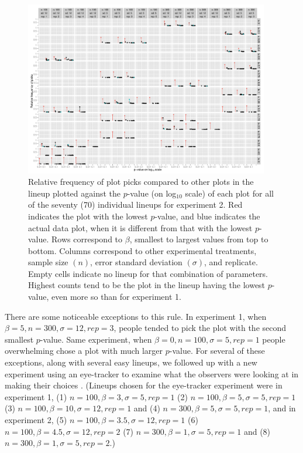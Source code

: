 \documentclass[12pt]{article}
\newcommand{\blue}[1]{{\color{blue} #1}} %
\begin{document}
\begin{figure}[hbtp]
   \centering
       \includegraphics[width=0.95\textwidth]{p_val_log_counts2.pdf}
       \caption{Relative frequency of plot picks compared to other plots in the lineup plotted against the $p$-value (on log$_{10}$ scale) of each plot for all of the seventy (70) individual lineups for experiment 2. \blue{Red indicates the} plot with the lowest $p$-value, and \blue{blue indicates} the actual data plot, when it is different from that with the lowest $p$-value. Rows correspond to $\beta$, smallest to largest values from top to bottom. Columns correspond to other experimental treatments, sample size $(n)$, error standard deviation $(\sigma)$, and replicate. Empty cells indicate no lineup for that combination of parameters. Highest counts tend to be the plot in the lineup having the lowest $p$-value, even more so than for experiment 1.}
       \label{fig:P-val_log2}
\end{figure}


There are some noticeable exceptions to this rule. In experiment 1, when $\beta=5, n=300, \sigma=12, rep=3$, people tended to pick the plot with the second smallest $p$-value.  Same experiment, when $\beta=0, n=100, \sigma=5, rep=1$ people overwhelming chose a plot with much larger $p$-value. For several of these exceptions, along with several easy lineups, we followed up with a new experiment using an eye-tracker to examine what the observers were looking at in making their choices \citep{zhao:2012}.
(Lineups chosen for the eye-tracker experiment were in experiment 1, (1) $n=100, \beta=3, \sigma=5, rep=1$ (2) $n=100, \beta=5, \sigma=5, rep=1$ (3) $n=100, \beta=10, \sigma=12, rep=1$ and (4) $n=300, \beta=5, \sigma=5, rep=1$, and in experiment 2, (5) $n=100, \beta=3.5, \sigma=12, rep=1$ (6) $n=100, \beta=4.5, \sigma=12, rep=2$ (7) $n=300, \beta=1, \sigma=5, rep=1$ and (8) $n=300, \beta=1, \sigma=5, rep=2$.)
\end{document}
